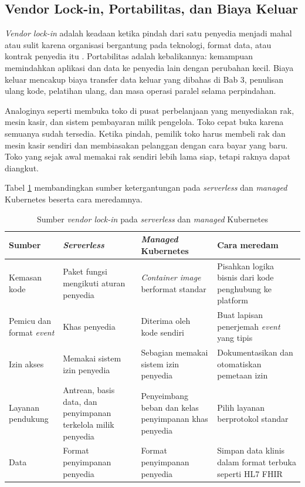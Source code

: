 \subsection{Vendor Lock-in, Portabilitas, dan Biaya Keluar}

\textit{Vendor lock-in} adalah keadaan ketika pindah dari satu penyedia menjadi mahal atau sulit
karena organisasi bergantung pada teknologi, format data, atau kontrak penyedia itu
\cite{c08-opara2016}. Portabilitas adalah kebalikannya: kemampuan memindahkan aplikasi dan data ke
penyedia lain dengan perubahan kecil. Biaya keluar mencakup biaya transfer data keluar yang dibahas
di Bab 3, penulisan ulang kode, pelatihan ulang, dan masa operasi paralel selama perpindahan.

Analoginya seperti membuka toko di pusat perbelanjaan yang menyediakan rak, mesin kasir, dan sistem
pembayaran milik pengelola. Toko cepat buka karena semuanya sudah tersedia. Ketika pindah, pemilik
toko harus membeli rak dan mesin kasir sendiri dan membiasakan pelanggan dengan cara bayar yang
baru. Toko yang sejak awal memakai rak sendiri lebih lama siap, tetapi raknya dapat diangkut.

Tabel \ref{tab:ch08-sumber-lockin} membandingkan sumber ketergantungan pada \textit{serverless} dan
\textit{managed} Kubernetes beserta cara meredamnya.

\begin{table}[!htb]
  \centering
  \caption{Sumber \textit{vendor lock-in} pada \textit{serverless} dan \textit{managed} Kubernetes}
  \label{tab:ch08-sumber-lockin}
  \footnotesize
  \begin{tabularx}{\textwidth}{>{\raggedright\arraybackslash}p{2.2cm}
      >{\raggedright\arraybackslash}X >{\raggedright\arraybackslash}X
      >{\raggedright\arraybackslash}X}
    \hline
    \textbf{Sumber} & \textbf{\textit{Serverless}} & \textbf{\textit{Managed} Kubernetes} &
      \textbf{Cara meredam} \\ \hline
    Kemasan kode & Paket fungsi mengikuti aturan penyedia & \textit{Container image} berformat
      standar & Pisahkan logika bisnis dari kode penghubung ke platform \\ \hline
    Pemicu dan format \textit{event} & Khas penyedia & Diterima oleh kode sendiri & Buat lapisan
      penerjemah \textit{event} yang tipis \\ \hline
    Izin akses & Memakai sistem izin penyedia & Sebagian memakai sistem izin penyedia &
      Dokumentasikan dan otomatiskan pemetaan izin \\ \hline
    Layanan pendukung & Antrean, basis data, dan penyimpanan terkelola milik penyedia &
      Penyeimbang beban dan kelas penyimpanan khas penyedia & Pilih layanan berprotokol
      standar \\ \hline
    Data & Format penyimpanan penyedia & Format penyimpanan penyedia & Simpan data klinis dalam
      format terbuka seperti HL7 FHIR \\ \hline
  \end{tabularx}
\end{table}

